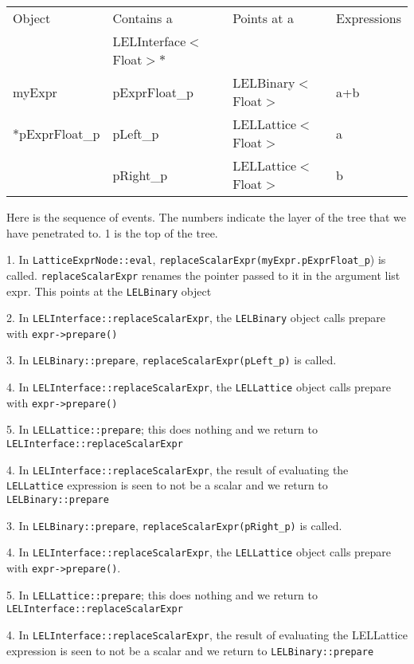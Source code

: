 \begin{center}
\begin{tabular}{|l|l|l|l}
\hline
Object & Contains a & Points at a & Expressions \\
       & LELInterface$<$Float$>*$ & &    \\
\hline
myExpr  &   pExprFloat\_p  & LELBinary$<$Float$>$  & a+b \\
*pExprFloat\_p  &  pLeft\_p  &  LELLattice$<$Float$>$ &  a \\
                   &  pRight\_p  &  LELLattice$<$Float$>$ &  b \\
\hline
\end{tabular}
\end{center}



Here is the sequence of events.  The numbers indicate the layer
of the tree that we have penetrated to.  1 is the top of the tree.


1. In {\tt LatticeExprNode::eval}, {\tt replaceScalarExpr(myExpr.pExprFloat\_p}) is called.  
{\tt replaceScalarExpr} renames the pointer passed to it in the argument list expr.  
This points at the {\tt LELBinary} object 

2. In {\tt LELInterface::replaceScalarExpr}, the {\tt LELBinary} object calls prepare  
with {\tt expr->prepare()} 

3. In {\tt LELBinary::prepare}, {\tt replaceScalarExpr(pLeft\_p)} is called.

4. In {\tt LELInterface::replaceScalarExpr}, the {\tt LELLattice} object calls 
prepare with {\tt expr->prepare()} 

5. In {\tt LELLattice::prepare}; this does nothing and we 
return to {\tt LELInterface::replaceScalarExpr} 

4. In {\tt LELInterface::replaceScalarExpr}, the result of evaluating the {\tt LELLattice} 
expression is seen to not be a scalar and we return  to {\tt LELBinary::prepare} 

3. In {\tt LELBinary::prepare},  {\tt replaceScalarExpr(pRight\_p)} is called. 

4. In {\tt LELInterface::replaceScalarExpr}, the {\tt LELLattice} object calls prepare
with {\tt expr->prepare()}.  

5. In {\tt LELLattice::prepare}; this does nothing and we 
return to {\tt LELInterface::replaceScalarExpr} 

4. In {\tt LELInterface::replaceScalarExpr}, the result of evaluating the LELLattice  
expression is seen to not be a scalar and we return to {\tt LELBinary::prepare} 

